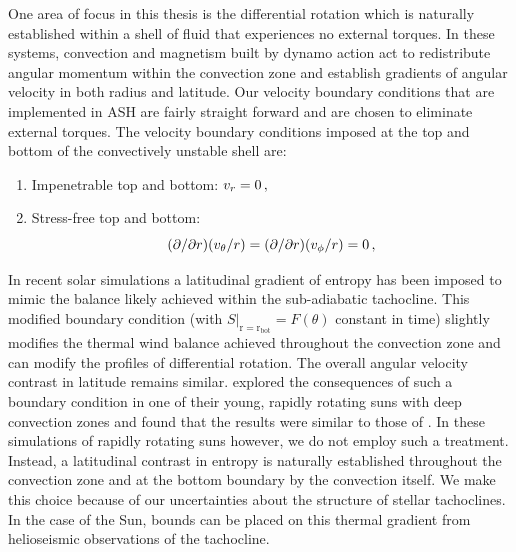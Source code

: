 One area of focus in this thesis is the differential rotation which is
naturally established within a shell of fluid that experiences no
external torques.  In these systems, convection and magnetism built by
dynamo action act to redistribute angular momentum within the
convection zone and establish gradients of angular velocity in both
radius and latitude.  Our velocity boundary conditions that are
implemented in ASH are fairly
straight forward and are chosen to eliminate external torques.
The velocity boundary conditions imposed at the top and
bottom of the convectively unstable shell are:
\begin{enumerate}
  \item Impenetrable top and bottom: $v_r = 0\thinspace,$
  \item Stress-free top and bottom:
    \begin{equation}
       (\partial/\partial r)(v_\theta/r) =
      (\partial/\partial r)(v_\phi/r) = 0\thinspace, 
    \end{equation}
\end{enumerate}

  In recent solar simulations \citep{Miesch_et_al_2006,
Miesch_et_al_2008} a latitudinal gradient of entropy has been
imposed to mimic the balance likely achieved within the sub-adiabatic
tachocline. This modified boundary condition (with
$S|_\mathrm{r=r_{bot}} = F(\theta)$ constant in time) slightly
modifies the thermal wind balance achieved throughout the convection
zone and can modify the profiles of differential rotation.  The
overall angular velocity contrast in latitude remains similar.  
\cite{Ballot_et_al_2007} explored the consequences of such a boundary
condition in one of their young, rapidly rotating suns with deep
convection zones and found that the results were similar to those of
\cite{Miesch_et_al_2006}. 
In these simulations of rapidly rotating suns however, we do not employ such a
treatment.  Instead, a latitudinal contrast in entropy is naturally
established throughout the convection zone and at the bottom boundary
by the convection itself.  We make this choice
because of our uncertainties about the structure of stellar
tachoclines.  In the case of the Sun, bounds can be placed on this
thermal gradient from helioseismic observations of the tachocline.  

